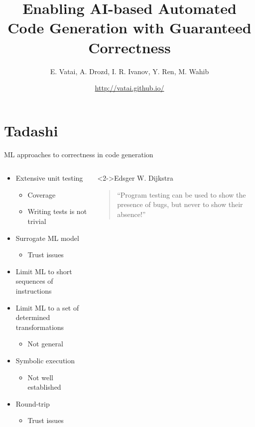 \documentclass[presentation, aspectratio=169]{beamer}
\author{\alert{E. Vatai}, A. Drozd, I. R. Ivanov, Y. Ren, M. Wahib}
\date{\url{http://vatai.github.io/}}
\title{Enabling AI-based Automated Code Generation with Guaranteed Correctness}
\begin{document}
\maketitle
\section{Tadashi}
\label{sec:org6f39c4c}
\begin{frame}[label={sec:orgf9dc1c3}]{ML approaches to correctness in code generation}
\begin{columns}
\begin{column}{0.45\columnwidth}
\begin{itemize}
\item <1-> Extensive unit testing
\begin{itemize}
\item Coverage
\item Writing tests is not trivial
\end{itemize}
\item <3-> Surrogate ML model
\begin{itemize}
\item Trust issues
\end{itemize}
\item <4-> Limit ML to short sequences of instructions
\item <4-> Limit ML to a set of determined transformations
\begin{itemize}
\item Not general
\end{itemize}
\item <5-> Symbolic execution
\begin{itemize}
\item Not well established
\end{itemize}
\item <6-> Round-trip
\begin{itemize}
\item Trust issues
\end{itemize}
\end{itemize}
\end{column}
\begin{column}{0.45\columnwidth}
\begin{block}<2->{Edsger W. Dijkstra}
\begin{quote}
``Program testing can be used to show the presence of bugs, but never to show their absence!''
\end{quote}
\end{block}
\end{column}
\end{columns}
\end{frame}
\end{document}
